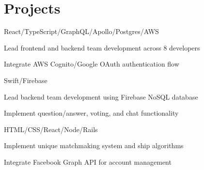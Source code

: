 \documentclass[]{deedy-resume}
\begin{document}
\begin{minipage}[t]{0.66\textwidth}

\section{Projects}

\begin{tightemize}
    \item React/TypeScript/GraphQL/Apollo/Postgres/AWS
    \item Lead frontend and backend team development across 8 developers
    \item Integrate AWS Cognito/Google OAuth authentication flow
\end{tightemize}
\sectionsep{}

\begin{tightemize}
    \item Swift/Firebase
    \item Lead backend team development using Firebase NoSQL database
    \item Implement question/answer, voting, and chat functionality
\end{tightemize}
\sectionsep{}

\begin{tightemize}
  \item HTML/CSS/React/Node/Rails
  \item Implement unique matchmaking system and ship algorithms
  \item Integrate Facebook Graph API for account management
\end{tightemize}
\sectionsep{}

\end{minipage}
\end{document}
